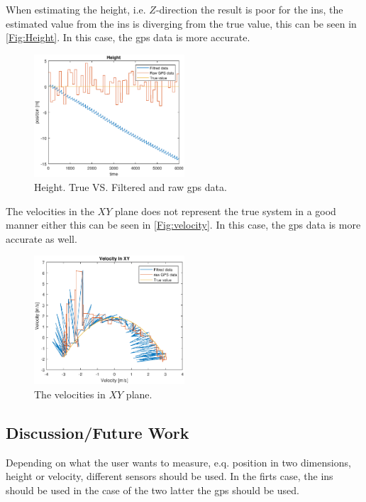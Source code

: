 When estimating the height, i.e. $Z$-direction the result is poor for the \gls{ins}, the estimated value from the \gls{ins} is diverging from the true value, this can be seen in \autoref{Fig:Height}. In this case, the \gls{gps} data is more accurate. 
\begin{figure}[H]
\centering
\includegraphics[width=0.5\textwidth]{Height.eps}
\caption{Height. True VS. Filtered and raw \gls{gps} data.}
\label{Fig:Height}
\end{figure}
The velocities in the $XY$ plane does not represent the true system in a good manner either this can be seen in \autoref{Fig:velocity}. In this case, the \gls{gps} data is more accurate as well.

\begin{figure}[H]
\centering
\includegraphics[width=0.5\textwidth]{velocity.eps}
\caption{The velocities in $XY$ plane.}
\label{Fig:velocity}
\end{figure}
\subsection{Discussion/Future Work}
Depending on what the user wants to measure, e.q. position in two dimensions, height or velocity, different sensors should be used. In the firts case, the \gls{ins} should be used in the case of the two latter the \gls{gps} should be used. \\

